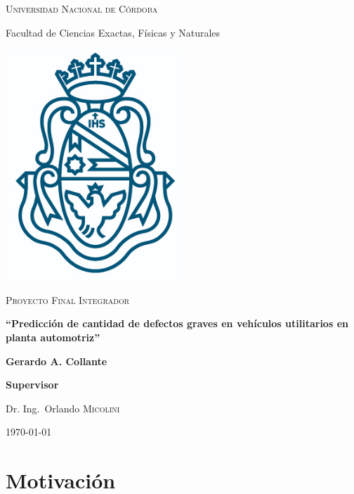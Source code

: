 \documentclass[a4paper,12pt]{article}
\begin{document}
\begin{titlepage}
	
	{\scshape\LARGE Universidad Nacional de Córdoba \par}
	{\Large Facultad de Ciencias Exactas, Físicas y Naturales \par}
	\vspace{0.5cm}
	\centering
	\includegraphics[width=0.5\textwidth]{unc.png}
	\par\vspace{0.5cm}
	\vspace{0.5cm}
	{\scshape\Large Proyecto Final Integrador\par}
	\vspace{1.5cm}
	{\large\bfseries ``Predicción de cantidad de defectos graves en vehículos utilitarios en planta automotriz'' \par}
	\vspace{1.5cm}
	{\Large\bfseries Gerardo A. Collante\par}
	
	\vfill
	\textbf{Supervisor}\par
	Dr. Ing.~Orlando \textsc{Micolini}

	\vfill

	{\large \today\par}
\end{titlepage}

\tableofcontents

\clearpage

\section{Motivación}
\end{document}
